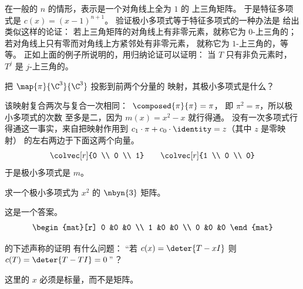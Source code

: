 \begin{exercises}
\begin{answer}
      在一般的 $n$ 的情形，表示是一个对角线上全为 $1$ 的
      上三角矩阵。
      于是特征多项式是 $c(x)=(x-1)^{n+1}$。
      验证极小多项式等于特征多项式的一种办法是
      给出类似这样的论证：
      若上三角矩阵的对角线上有非零元素，就称它为 $0$-上三角的；
      若对角线上只有零而对角线上方紧邻处有非零元素，
      就称它为 $1$-上三角的，等等。
      正如上面的例子所说明的，用归纳论证可以证明：
      当 $T$ 只有非负元素时，
      $T^j$ 是 $j$-上三角的。
    \end{answer}
   \item 
     把 \( \map{\pi}{\C^3}{\C^3} \) 投影到前两个分量的
     映射，其极小多项式是什么？
      \begin{answer}
        该映射复合两次与复合一次相同：~$\composed{\pi}{\pi}=\pi$，
        即 $\pi^2=\pi$，所以极小多项式的次数
        至多是二，因为 \( m(x)=x^2-x \) 就行得通。
        没有一次多项式行得通这一事实，来自把映射作用到
        $c_1\cdot \pi+c_0\cdot \identity=z$（其中 $z$ 是零映射）
        的左右两边于下面这两个向量。
        \begin{equation*}
          \colvec[r]{0 \\ 0 \\ 1}
          \qquad
          \colvec[r]{1 \\ 0 \\ 0}
        \end{equation*}
        于是极小多项式是 $m$。
      \end{answer}
   \item 
     求一个极小多项式为 \( x^2 \) 的
     \( \nbyn{3} \) 矩阵。
      \begin{answer}
         这是一个答案。
         \begin{equation*}
             \begin{mat}[r]
               0  &0  &0  \\
               1  &0  &0  \\
               0  &0  &0
             \end{mat}
         \end{equation*} 
       \end{answer}
  \item 
      的下述声称的证明
     有什么问题：
      ``若 \( c(x)=\deter{T-xI} \) 则 \( c(T)=\deter{T-TI}=0 \,\)''\,？
     \cite{Cullen}
      \begin{answer}
        这里的 \( x \) 必须是标量，而不是矩阵。
      \end{answer}

\end{exercises}
